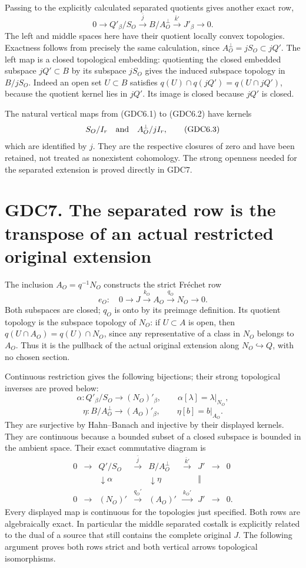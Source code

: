 Passing to the explicitly calculated separated quotients gives another
exact row, \[
\boxed{0\to Q'_\beta/S_O\xrightarrow{\bar j}
B/A_O^\perp\xrightarrow{\bar k'}J'_\beta\to0.}
\tag{GDC6.2}
\] The left and middle spaces here have their quotient locally convex
topologies. Exactness follows from precisely the same calculation, since
\(A_O^\perp=jS_O\subset jQ'\). The left map is a closed topological
embedding: quotienting the closed embedded subspace \(jQ'\subset B\) by
its subspace \(jS_O\) gives the induced subspace topology in \(B/jS_O\).
Indeed an open set \(U\subset B\) satisfies
\(q(U)\cap q(jQ')=q(U\cap jQ')\), because the quotient kernel lies in
\(jQ'\). Its image is closed because \(jQ'\) is closed.

The natural vertical maps from (GDC6.1) to (GDC6.2) have kernels \[
S_O/I_r\quad\hbox{and}\quad A_O^\perp/jI_r,
\tag{GDC6.3}
\] which are identified by \(j\). They are the respective closures of
zero and have been retained, not treated as nonexistent cohomology. The
strong openness needed for the separated extension is proved directly in
GDC7.

\section{GDC7. The separated row is the transpose of an actual
restricted original
extension}\label{gdc7.-the-separated-row-is-the-transpose-of-an-actual-restricted-original-extension}

The inclusion \(A_O=q^{-1}N_O\) constructs the strict Fréchet row \[
e_O:\quad0\to J\xrightarrow{k_O}A_O\xrightarrow{q_O}N_O\to0.
\tag{GDC7.1}
\] Both subspaces are closed; \(q_O\) is onto by its preimage
definition. Its quotient topology is the subspace topology of \(N_O\):
if \(U\subset A\) is open, then \(q(U\cap A_O)=q(U)\cap N_O\), since any
representative of a class in \(N_O\) belongs to \(A_O\). Thus it is the
pullback of the actual original extension along
\(N_O\hookrightarrow Q\), with no chosen section.

Continuous restriction gives the following bijections; their strong
topological inverses are proved below: \[
\alpha:Q'_\beta/S_O\longrightarrow (N_O)'_\beta,
\qquad \alpha[\lambda]=\lambda|_{N_O},
\] \[
\eta:B/A_O^\perp\longrightarrow (A_O)'_\beta,
\qquad\eta[b]=b|_{A_O}.
\tag{GDC7.2}
\] They are surjective by Hahn--Banach and injective by their displayed
kernels. They are continuous because a bounded subset of a closed
subspace is bounded in the ambient space. Their exact commutative
diagram is \[
\begin{array}{ccccccccc}
0&\to&Q'/S_O&\xrightarrow{\bar j}&B/A_O^\perp&\xrightarrow{\bar k'}&J'&\to&0\\
&&\downarrow\alpha&&\downarrow\eta&&\Vert\\
0&\to&(N_O)'&\xrightarrow{q_O'}&(A_O)'&\xrightarrow{k_O'}&J'&\to&0.
\end{array}
\tag{GDC7.3}
\] Every displayed map is continuous for the topologies just specified.
Both rows are algebraically exact. In particular the middle separated
costalk is explicitly related to the dual of a source that still
contains the complete original \(J\). The following argument proves both
rows strict and both vertical arrows topological isomorphisms.

